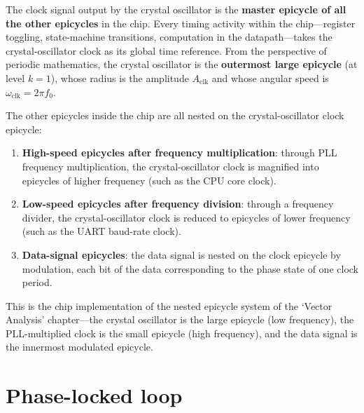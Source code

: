 \begin{definition}\label{def:quartz_master_epicycle}
The clock signal output by the crystal oscillator is the \textbf{master epicycle of all the other epicycles} in the chip. Every timing activity within the chip---register toggling, state-machine transitions, computation in the datapath---takes the crystal-oscillator clock as its global time reference. From the perspective of periodic mathematics, the crystal oscillator is the \textbf{outermost large epicycle} (at level $k=1$), whose radius is the amplitude $A_{\text{clk}}$ and whose angular speed is $\omega_{\text{clk}} = 2\pi f_0$.

The other epicycles inside the chip are all nested on the crystal-oscillator clock epicycle:
\begin{enumerate}[label=(\roman*)]
    \item \textbf{High-speed epicycles after frequency multiplication}: through PLL frequency multiplication, the crystal-oscillator clock is magnified into epicycles of higher frequency (such as the CPU core clock).
    \item \textbf{Low-speed epicycles after frequency division}: through a frequency divider, the crystal-oscillator clock is reduced to epicycles of lower frequency (such as the UART baud-rate clock).
    \item \textbf{Data-signal epicycles}: the data signal is nested on the clock epicycle by modulation, each bit of the data corresponding to the phase state of one clock period.
\end{enumerate}
This is the chip implementation of the nested epicycle system of the `Vector Analysis' chapter---the crystal oscillator is the large epicycle (low frequency), the PLL-multiplied clock is the small epicycle (high frequency), and the data signal is the innermost modulated epicycle.
\end{definition}

\section{Phase-locked loop}


